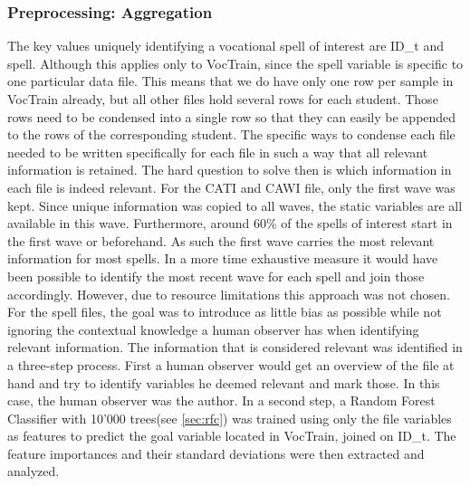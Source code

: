 \subsubsection{Preprocessing: Aggregation}
The key values uniquely identifying a vocational spell of interest are ID\_t and spell. Although this applies only to VocTrain, since the spell variable is specific to one particular data file. This means that we do have only one row per sample in VocTrain already, but all other files hold several rows for each student. Those rows need to be condensed into a single row so that they can easily be appended to the rows of the corresponding student. The specific ways to condense each file needed to be written specifically for each file in such a way that all relevant information is retained. The hard question to solve then is which information in each file is indeed relevant. For the CATI and CAWI file, only the first wave was kept. Since unique information was copied to all waves, the static variables are all available in this wave. Furthermore, around 60\% of the spells of interest start in the first wave or beforehand. As such the first wave carries the most relevant information for most spells. In a more time exhaustive measure it would have been possible to identify the most recent wave for each spell and join those accordingly. However, due to resource limitations this approach was not chosen. For the spell files, the goal was to introduce as little bias as possible while not ignoring the contextual knowledge a human observer has when identifying relevant information. The information that is considered relevant was identified in a three-step process. First a human observer would get an overview of the file at hand and try to identify variables he deemed relevant and mark those. In this case, the human observer was the author. In a second step, a Random Forest Classifier with 10'000 trees(see \ref{sec:rfc}) was trained using only the file variables as features to predict the goal variable located in VocTrain, joined on ID\_t. The feature importances and their standard deviations were then extracted and analyzed. %
